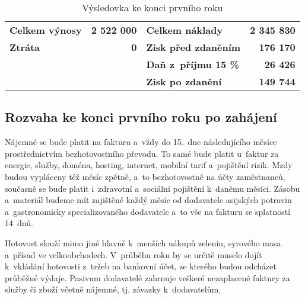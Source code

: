 \begin{table}[htbp]
\begin{center}
\begin{tabular}{lrlr}
\textbf{Celkem výnosy}\index{výnos} & \textbf{2 522 000}            & \textbf{Celkem náklady\index{náklad}}        & \textbf{2 345 830} \\
\textbf{Ztráta}        & \textbf{0}                    & \textbf{Zisk před zdaněním}    & \textbf{176 170}   \\
                       &                               & \textbf{Daň z~příjmu 15 \%}    & \textbf{26 426}    \\
                       &                               & \textbf{Zisk po zdanění}       & \textbf{149 744}  
\end{tabular}
\caption{Výsledovka ke konci prvního roku}
\label{vysledovka}
\end{center}
\end{table}

\newpage

\subsection{Rozvaha ke konci prvního roku po zahájení}
Nájemné se bude platit na fakturu a~vždy do 15.~dne následujícího měsíce prostřednictvím bezhotovostního převodu. To samé bude platit u~faktur za energie, služby, doména, hosting, internet, mobilní tarif a~pojištění rizik. Mzdy budou vypláceny též měsíc zpětně, a~to bezhotovostně na účty zaměstnanců, současně se bude platit i~zdravotní a~sociální pojištění k~danému měsíci. Zásobu a~materiál budeme mít zajištěné každý měsíc od dodavatele asijských potravin a~gastronomicky specializovaného dodavatele a~to vše na fakturu se splatností 14~dnů. 

Hotovost slouží mimo jiné hlavně k~menších nákupů zelenin, syrového masa a~přísad ve velkoobchodech. V~průběhu roku by se určitě muselo dojít k~vkládání hotovosti z~tržeb na bankovní účet, ze kterého budou odcházet průběžné výdaje. Pasivum dodavatelé zahrnuje veškeré nezaplacené faktury za služby či zboží včetně nájemné, tj. závazky k~dodavatelům.

